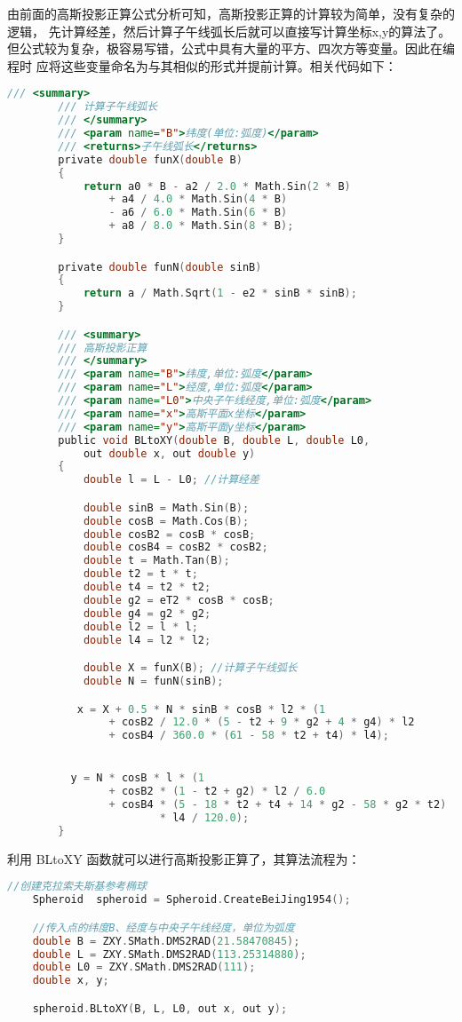  由前面的高斯投影正算公式分析可知，高斯投影正算的计算较为简单，没有复杂的逻辑，
 先计算经差，然后计算子午线弧长后就可以直接写计算坐标x,y的算法了。
 但公式较为复杂，极容易写错，公式中具有大量的平方、四次方等变量。因此在编程时
 应将这些变量命名为与其相似的形式并提前计算。相关代码如下：
 \begin{lstlisting}[language=C]
        /// <summary>
        /// 计算子午线弧长
        /// </summary>
        /// <param name="B">纬度(单位:弧度)</param>
        /// <returns>子午线弧长</returns>
        private double funX(double B)
        {
            return a0 * B - a2 / 2.0 * Math.Sin(2 * B)
                + a4 / 4.0 * Math.Sin(4 * B)
                - a6 / 6.0 * Math.Sin(6 * B)
                + a8 / 8.0 * Math.Sin(8 * B);
        }

        private double funN(double sinB)
        {
            return a / Math.Sqrt(1 - e2 * sinB * sinB);
        }

        /// <summary>
        /// 高斯投影正算
        /// </summary>
        /// <param name="B">纬度,单位:弧度</param>
        /// <param name="L">经度,单位:弧度</param>
        /// <param name="L0">中央子午线经度,单位:弧度</param>
        /// <param name="x">高斯平面x坐标</param>
        /// <param name="y">高斯平面y坐标</param>
        public void BLtoXY(double B, double L, double L0,
            out double x, out double y)
        {
            double l = L - L0; //计算经差

            double sinB = Math.Sin(B);
            double cosB = Math.Cos(B);
            double cosB2 = cosB * cosB;
            double cosB4 = cosB2 * cosB2;
            double t = Math.Tan(B);
            double t2 = t * t;
            double t4 = t2 * t2;
            double g2 = eT2 * cosB * cosB;
            double g4 = g2 * g2;
            double l2 = l * l;
            double l4 = l2 * l2;

            double X = funX(B); //计算子午线弧长
            double N = funN(sinB);

           x = X + 0.5 * N * sinB * cosB * l2 * (1
                + cosB2 / 12.0 * (5 - t2 + 9 * g2 + 4 * g4) * l2
                + cosB4 / 360.0 * (61 - 58 * t2 + t4) * l4);


          y = N * cosB * l * (1
                + cosB2 * (1 - t2 + g2) * l2 / 6.0
                + cosB4 * (5 - 18 * t2 + t4 + 14 * g2 - 58 * g2 * t2)
                        * l4 / 120.0);
        }
 \end{lstlisting}

利用 BLtoXY 函数就可以进行高斯投影正算了，其算法流程为：
 \begin{lstlisting}[language=C]
    //创建克拉索夫斯基参考椭球
    Spheroid  spheroid = Spheroid.CreateBeiJing1954();

    //传入点的纬度B、经度与中央子午线经度，单位为弧度
    double B = ZXY.SMath.DMS2RAD(21.58470845);
    double L = ZXY.SMath.DMS2RAD(113.25314880);
    double L0 = ZXY.SMath.DMS2RAD(111);
    double x, y;

    spheroid.BLtoXY(B, L, L0, out x, out y);
\end{lstlisting}

